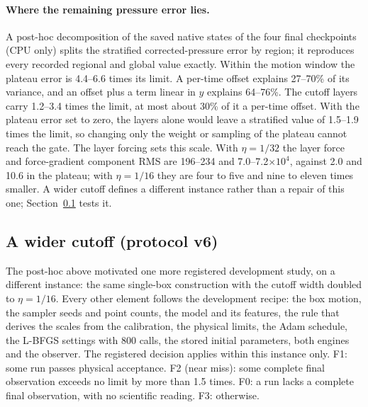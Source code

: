 \documentclass[11pt]{article}
\begin{document}
\paragraph{Where the remaining pressure error lies.}
A post-hoc decomposition of the saved native states of the four final
checkpoints (CPU only) splits the stratified corrected-pressure error by
region; it reproduces every recorded regional and global value exactly.
Within the motion window the plateau error is 4.4--6.6 times its limit. A
per-time offset explains 27--70\% of its variance, and an offset plus a
term linear in $y$ explains 64--76\%. The cutoff layers carry 1.2--3.4 times
the limit, at most about 30\% of it a per-time offset. With the plateau error set
to zero, the layers alone would leave a stratified value of 1.5--1.9 times
the limit, so changing only the weight or sampling of the plateau cannot
reach the gate. The layer forcing sets this scale. With $\eta=1/32$ the
layer force and force-gradient component RMS are 196--234 and
7.0--7.2$\times10^{4}$, against 2.0 and 10.6 in the plateau; with
$\eta=1/16$ they are four to five and nine to eleven times smaller. A wider
cutoff defines a different instance rather than a repair of this one;
Section~\ref{sec:c36v6} tests it.

\subsection{A wider cutoff (protocol v6)}\label{sec:c36v6}
The post-hoc above motivated one more registered development study, on a
different instance: the same single-box construction with the cutoff width
doubled to $\eta=1/16$. Every other element follows the development
recipe: the box motion, the sampler seeds and point counts, the model and
its features, the rule that derives the scales from the calibration, the
physical limits, the Adam schedule, the L-BFGS settings with 800 calls, the
stored initial parameters, both engines and the observer. The registered
decision applies within this instance only. F1: some run passes physical
acceptance. F2 (near miss): some complete final observation exceeds no
limit by more than 1.5 times. F0: a run lacks a complete final observation,
with no scientific reading. F3: otherwise.
\end{document}
